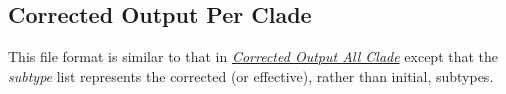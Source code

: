 \documentclass[letterpaper,10pt,english]{sphinxmanual}
\begin{document}
\subsection{Corrected Output Per Clade}
\label{defs:correctedperclade}\label{defs:corrected-output-per-clade}
This file format is similar to that in {\hyperref[defs:correctedall]{\emph{Corrected Output All Clade}}} except that the \emph{subtype} list represents the corrected (or effective), rather than initial, subtypes.



\renewcommand{\indexname}{Index}
\printindex
\end{document}
